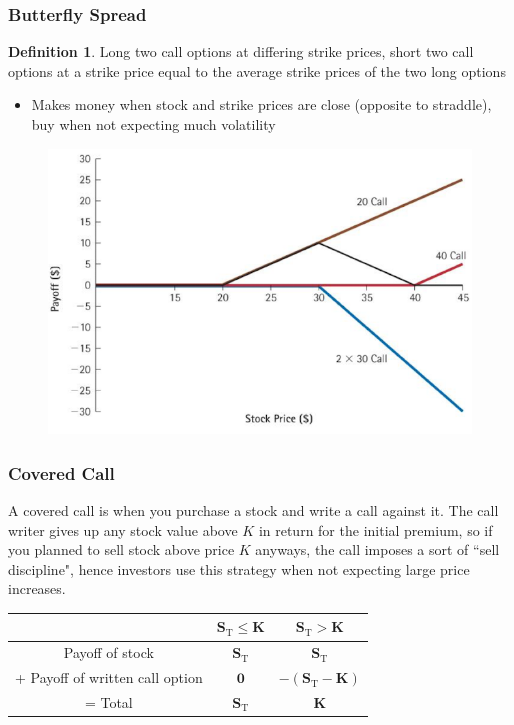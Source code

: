\documentclass[11pt]{article}
\theoremstyle{definition}
\newtheorem*{definition}{Definition}
\begin{document}
\subsubsection{Butterfly Spread}
\begin{definition}
    Long two call options at differing strike prices, short two call options at a strike price equal to the average strike prices of the two long options
    \begin{itemize}
        \item Makes money when stock and strike prices are close (opposite to straddle), buy when not expecting much volatility
    \end{itemize}
\end{definition}
\begin{figure}[h]
    \centering
    \includegraphics[scale=0.25]{Screenshot 2023-12-12 at 01.46.48.png}
\end{figure}

\subsubsection{Covered Call}
A covered call is when you purchase a stock and write a call against it. The call writer gives up any stock value above $K$ in return for the initial premium, so if you planned to sell stock above price $K$ anyways, the call imposes a sort of ``sell discipline", hence investors use this strategy when not expecting large price increases. 
\begin{center}
\begin{tabular}{ccc} 
& $\mathbf{S}_{\mathrm{T}} \leq \mathbf{K}$ & $\mathbf{S}_{\mathrm{T}}>\mathbf{K}$ \\
\hline Payoff of stock & $\mathbf{S}_{\mathrm{T}}$ & $\mathbf{S}_{\mathrm{T}}$ \\
+ Payoff of written call option & $\mathbf{0}$ & $-\left(\mathbf{S}_{\mathrm{T}}-\mathbf{K}\right)$ \\
\hline = Total & $\mathbf{S}_{\mathrm{T}}$ & $\mathbf{K}$
\end{tabular}
\end{center}
\end{document}
